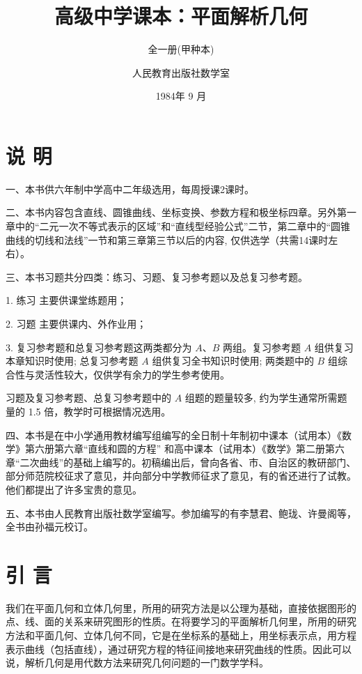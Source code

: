\documentclass[lang=cn,newtx,12pt,scheme=chinese]{elegantbook}
\title{高级中学课本：平面解析几何}
\subtitle{全一册(甲种本)}
\author{人民教育出版社数学室}
\institute{人民教育出版社}
\date{1984年 9 月}
\begin{document}
\maketitle

\chapter*{说 明}

  一、本书供六年制中学高中二年级选用，每周授课2课时。

  二、本书内容包含直线、圆锥曲线、坐标变换、参数方程和极坐标四章。另外第一章中的“二元一次不等式表示的区域”和“直线型经验公式”二节，第二章中的“圆锥曲线的切线和法线”一节和第三章第三节以后的内容, 仅供选学（共需14课时左右）。

  三、本书习题共分四类：练习、习题、复习参考题以及总复习参考题。

  1. 练习 主要供课堂练题用；

  2. 习题 主要供课内、外作业用；

  3. 复习参考题和总复习参考题这两类都分为 \(A\text{、}B\) 两组。复习参考题 \(A\) 组供复习本章知识时使用; 总复习参考题 \(A\) 组供复习全书知识时使用; 两类题中的 \(B\) 组综合性与灵活性较大，仅供学有余力的学生参考使用。

  习题及复习参考题、总复习参考题中的 \(A\) 组题的题量较多, 约为学生通常所需题量的 1.5 倍，教学时可根据情况选用。

  四、本书是在中小学通用教材编写组编写的全日制十年制初中课本（试用本）《数学》第六册第六章“直线和圆的方程” 和高中课本（试用本）《数学》第二册第六章“二次曲线”的基础上编写的。初稿编出后，曾向各省、市、自治区的教研部门、部分师范院校征求了意见，并向部分中学教师征求了意见，有的省还进行了试教。他们都提出了许多宝贵的意见。

  五、本书由人民教育出版社数学室编写。参加编写的有李慧君、鲍珑、许曼阁等，全书由孙福元校订。

\frontmatter

\tableofcontents

\mainmatter

\chapter*{引 言}

我们在平面几何和立体几何里，所用的研究方法是以公理为基础，直接依据图形的点、线、面的关系来研究图形的性质。在将要学习的平面解析几何里，所用的研究方法和平面几何、立体几何不同，它是在坐标系的基础上，用坐标表示点，用方程表示曲线（包括直线），通过研究方程的特征间接地来研究曲线的性质。因此可以说，解析几何是用代数方法来研究几何问题的一门数学学科。
\end{document}
